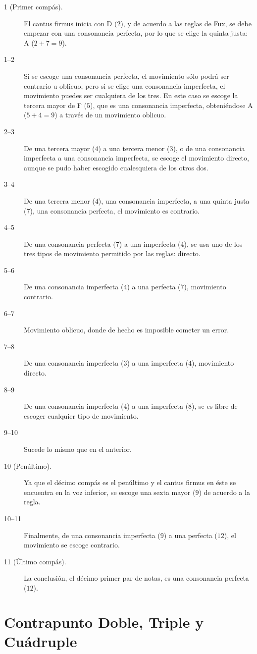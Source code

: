 \documentclass[letterpaper,12pt]{book}
\theoremstyle{definition} \newtheorem{Def}{Definición}[chapter]
\theoremstyle{definition} \newtheorem{Teo}{Teorema}[chapter]
\theoremstyle{definition} \newtheorem{Pro}{Proposición}[chapter]
\theoremstyle{definition} \newtheorem{Lema}{Lema}[chapter]
\begin{document}
\begin{description}
\item[1 (Primer compás).] El cantus firmus inicia con D ($2$), y de acuerdo a las reglas de Fux, se debe empezar con una consonancia perfecta, por lo que se elige la quinta justa: A ($2+7=9$).
\item[1--2] Si se escoge una consonancia perfecta, el movimiento sólo podrá ser contrario u oblicuo, pero si se elige una consonancia imperfecta, el movimiento puedes ser cualquiera de los tres. En este caso se escoge la tercera mayor de F ($5$), que es una consonancia imperfecta, obteniéndose A ($5+4=9$) a través de un movimiento oblicuo. 
\item[2--3] De una tercera mayor ($4$) a una tercera menor ($3$), o de una consonancia imperfecta a una consonancia imperfecta, se escoge el movimiento directo, aunque se pudo haber escogido cualesquiera de los otros dos. 
\item[3--4] De una tercera menor ($4$), una consonancia imperfecta, a una quinta justa ($7$), una consonancia perfecta, el movimiento es contrario. 
\item[4--5] De una consonancia perfecta ($7$) a una imperfecta ($4$), se usa uno de los tres tipos de movimiento permitido por las reglas: directo. 
\item[5--6] De una consonancia imperfecta ($4$) a una perfecta ($7$), movimiento contrario.
\item[6--7] Movimiento oblicuo, donde de hecho es imposible cometer un error.
\item[7--8] De una consonancia imperfecta ($3$) a una imperfecta ($4$), movimiento directo. 	
\item[8--9] De una consonancia imperfecta ($4$) a una imperfecta ($8$), se es libre de escoger cualquier tipo de movimiento. 
\item[9--10] Sucede lo mismo que en el anterior. 
\item[10 (Penúltimo).] Ya que el décimo compás es el penúltimo y el cantus firmus en éste se encuentra en la voz inferior, se escoge una sexta mayor ($9$) de acuerdo a la regla. 
\item[10--11] Finalmente, de una consonancia imperfecta ($9$) a una perfecta ($12$), el movimiento se escoge contrario. 
\item[11 (Último compás).] La conclusión, el décimo primer par de notas, es una consonancia perfecta ($12$).  
\end{description}

\section{Contrapunto Doble, Triple y Cuádruple}\label{Doble}
\end{document}
